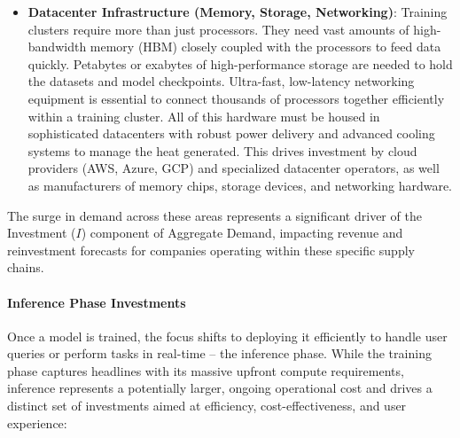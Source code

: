 \begin{itemize}
    \item \textbf{Datacenter Infrastructure (Memory, Storage, Networking)}: Training clusters require more than just processors. They need vast amounts of high-bandwidth memory (HBM) closely coupled with the processors to feed data quickly. Petabytes or exabytes of high-performance storage are needed to hold the datasets and model checkpoints. Ultra-fast, low-latency networking equipment is essential to connect thousands of processors together efficiently within a training cluster. All of this hardware must be housed in sophisticated datacenters with robust power delivery and advanced cooling systems to manage the heat generated. This drives investment by cloud providers (AWS, Azure, GCP) and specialized datacenter operators, as well as manufacturers of memory chips, storage devices, and networking hardware.
\end{itemize}
The surge in demand across these areas represents a significant driver of the Investment (\(I\)) component of Aggregate Demand, impacting revenue and reinvestment forecasts for companies operating within these specific supply chains.

\paragraph{Inference Phase Investments}
Once a model is trained, the focus shifts to deploying it efficiently to handle user queries or perform tasks in real-time – the inference phase. While the training phase captures headlines with its massive upfront compute requirements, inference represents a potentially larger, ongoing operational cost and drives a distinct set of investments aimed at efficiency, cost-effectiveness, and user experience:

